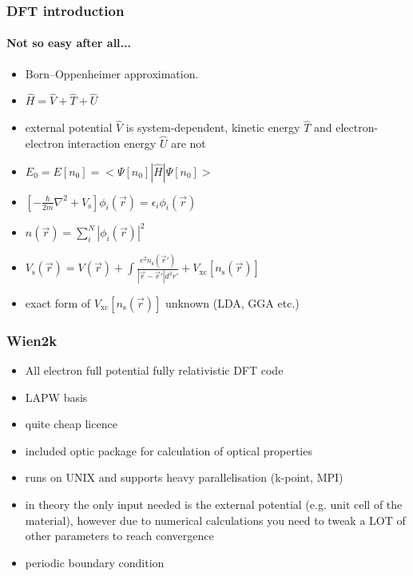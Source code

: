 \documentclass{beamer}
\begin{document}
\begin{frame}
    \frametitle{DFT introduction}
    \framesubtitle{Not so easy after all...}

	\begin{itemize}
	\item Born–Oppenheimer approximation.
	\item $\hat{H} = \hat{V} + \hat{T} + \hat{U}$
	\item external potential $\hat{V}$ is system-dependent, kinetic energy $\hat{T}$ and electron-electron interaction energy $\hat{U}$ are not
	\item $E_0 = E[n_0] = <\Psi[n_0] | \hat{H} | \Psi[n_0]> $
	\item $[-\frac{\hbar}{2m} \nabla^2 + V_\mathrm{s} ] \phi_i(\vec{r}) = \epsilon_i \phi_i(\vec{r}) $
	\item $n(\vec{r}) = \sum_i^N | \phi_i(\vec{r}) |^2$
	\item $V_\mathrm{s}(\vec{r}) = V(\vec{r}) + \int{\frac{e^2 n_\mathrm{s}(\vec{r}')}{|\vec{r}-\vec{r}'|d^3r'}} + V_\mathrm{xc}[n_\mathrm{s}(\vec{r})]$
	\item exact form of $V_\mathrm{xc}[n_\mathrm{s}(\vec{r})]$ unknown (LDA, GGA etc.)

	\end{itemize}

\end{frame}

\begin{frame}
    \frametitle{Wien2k}

	\begin{itemize}
	\item All electron full potential fully relativistic DFT code 
	\item LAPW basis
	\item quite cheap licence
	\item included optic package for calculation of optical properties
	\item runs on UNIX and supports heavy parallelisation (k-point, MPI)
	\item in theory the only input needed is the external potential (e.g. unit cell of the material), however due to numerical calculations you need to tweak a LOT of other parameters to reach convergence
	\item periodic boundary condition

	\end{itemize}

\end{frame}
\end{document}
